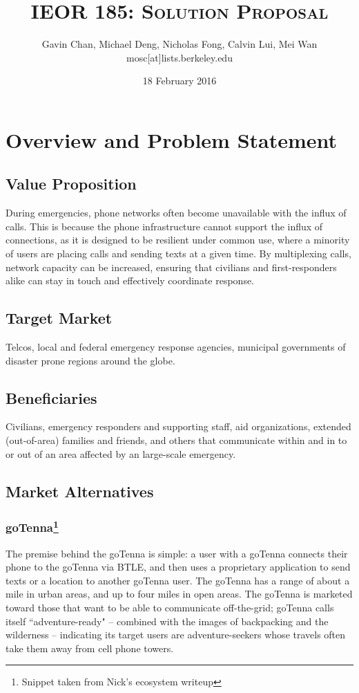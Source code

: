 \documentclass[10pt]{article}
\begin{document}
\title{\textsc{IEOR 185: Solution Proposal}}
\author{
    Gavin Chan,
    Michael Deng,
    Nicholas Fong,
    Calvin Lui,
    Mei Wan\\
    mosc[at]lists.berkeley.edu\\
}
\date{18 February 2016}
\maketitle

\section{Overview and Problem Statement}
\subsection*{Value Proposition}
During emergencies, phone networks often become unavailable with the influx of
calls.  This is because the phone infrastructure cannot support the influx of
connections, as it is designed to be resilient under common use, where a
minority of users are placing calls and sending texts at a given time.  By
multiplexing calls, network capacity can be increased, ensuring that civilians
and first-responders alike can stay in touch and effectively coordinate
response.
\subsection*{Target Market}
Telcos, local and federal emergency response agencies, municipal governments of
disaster prone regions around the globe.
\subsection*{Beneficiaries}
Civilians, emergency responders and supporting staff, aid organizations,
extended (out-of-area) families and friends, and others that communicate within
and in to or out of an area affected by an large-scale emergency.
\subsection*{Market Alternatives}
\subsubsection*{goTenna\footnote{Snippet taken from Nick's ecosystem writeup}}
The premise behind the goTenna is simple: a user with a goTenna connects their
phone to the goTenna via BTLE, and then uses a proprietary application to send
texts or a location to another goTenna user.   The goTenna has a range of about
a mile in urban areas, and up to four miles in open areas.  The goTenna is
marketed toward those that want to be able to communicate off-the-grid; goTenna
calls itself ``adventure-ready" -- combined with the images of backpacking and
the wilderness -- indicating its target users are adventure-seekers whose
travels often take them away from cell phone towers.
\end{document}
